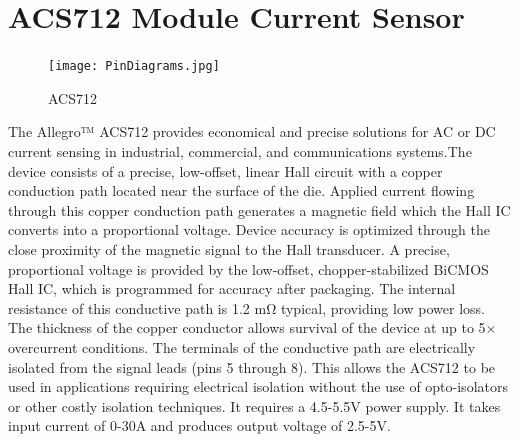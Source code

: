 \section{ACS712 Module Current Sensor}{
	\begin{figure}[H]
	    \texttt{[image: PinDiagrams.jpg]}
	    \caption{ACS712}
	    \label{fig:my_label}
	\end{figure}
	The Allegro™ ACS712 provides economical and precise solutions for AC or DC current sensing in industrial, commercial, and communications systems.The device consists of a precise, low-offset, linear Hall circuit with a copper conduction path located near the surface of the die. Applied current flowing through this copper conduction path generates a magnetic field which the Hall IC converts into a proportional voltage. Device accuracy is optimized through the close proximity of the magnetic signal to the Hall transducer. A precise, proportional voltage is provided by the low-offset, chopper-stabilized BiCMOS Hall IC, which is programmed for accuracy after packaging. The internal resistance of this conductive path is 1.2 mΩ typical, providing low power loss. The thickness of the copper conductor allows survival of the device at up to 5× overcurrent conditions. The terminals of the conductive path are electrically isolated from the signal leads (pins 5 through 8). This allows the ACS712 to be used in applications requiring electrical isolation without the use of opto-isolators or other costly isolation techniques. It requires a 4.5-5.5V power supply. It takes input current of 0-30A and produces output voltage of 2.5-5V.
	
}
